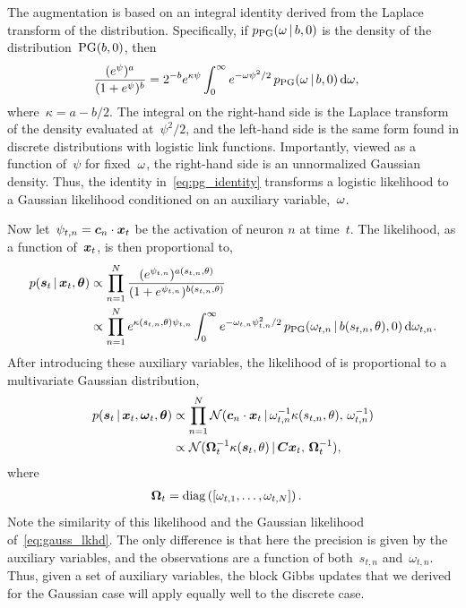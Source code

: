The augmentation is based on an integral identity
derived from the Laplace transform of the \polyagamma distribution.
Specifically, if $p_{\mathrm{PG}}({\omega}\,|\, b, 0)$ is the
density of the \polyagamma distribution~${\mathrm{PG}(b, 0)}$,
then
\begin{align}
  \frac{(e^{\psi})^a}{(1+e^{\psi})^b}
  &= 2^{-b} e^{\kappa \psi}
  \int_{0}^{\infty} e^{-{\omega} \psi^2 /2} \,
  p_{\mathrm{PG}}({\omega} \,|\, b, 0) \, \mathrm{d}{\omega},
\label{eq:pg_identity}
\end{align}
where~${\kappa=a-b/2}$. The integral on the right-hand side is the
Laplace transform of the \polyagamma density evaluated at~$\psi^2/2$,
and the left-hand side is the same form found in discrete
distributions with logistic link functions.  Importantly, viewed as a
function of~$\psi$ for fixed~${\omega}$, the right-hand side is an
unnormalized Gaussian density.  Thus, the identity
in~\eqref{eq:pg_identity} transforms a logistic likelihood to a
Gaussian likelihood conditioned on an auxiliary variable,~${\omega}$.

Now let~$\psi_{t,n} = \boldsymbol{c}_n \cdot \boldsymbol{x}_t$ be the activation of neuron
$n$ at time~$t$. The likelihood, as a function of~$\boldsymbol{x}_t$, is then
proportional to,
\begin{align*}
  p(\boldsymbol{s}_t \,|\, \boldsymbol{x}_t, \boldsymbol{\theta})
  &\propto \prod_{n=1}^N 
  \frac{(e^{\psi_{t,n}})^{a(s_{t,n}, \theta)}}
       {(1+e^{\psi_{t,n}})^{b(s_{t,n}, \theta)}} \\
  &\propto \prod_{n=1}^N 
     e^{\kappa(s_{t,n}, \theta) \psi_{t,n}}
  \int_{0}^{\infty} e^{-{\omega}_{t,n} \psi_{t,n}^2 /2} \,
  p_{\mathrm{PG}}({\omega}_{t,n} \,|\, b(s_{t,n}, \theta), 0) \,
  \mathrm{d}{\omega}_{t,n}.
\end{align*}
After introducing these auxiliary variables, the likelihood
of is proportional to a multivariate Gaussian distribution,
\begin{align*}
  p(\boldsymbol{s}_t \,|\, \boldsymbol{x}_t, \boldsymbol{\omega}_t, \boldsymbol{\theta})
  &\propto \prod_{n=1}^N
  \mathcal{N}(\boldsymbol{c}_n \cdot \boldsymbol{x}_t \,|\,
  \omega_{t,n}^{-1} \kappa(s_{t,n}, \theta), \,
  \omega_{t,n}^{-1}) \\
  &\propto \mathcal{N}(
  \boldsymbol{\Omega}_t^{-1} \kappa(\boldsymbol{s}_t, \theta) \,|\,
  \boldsymbol{C} \boldsymbol{x}_t, \, 
  \boldsymbol{\Omega}_t^{-1}),
\end{align*}
where
\begin{align*}
  \boldsymbol{\Omega}_t &= \mathrm{diag} \left( \left[ \omega_{t,1}, \ldots, \omega_{t,N} \right] \right).
\end{align*}
Note the similarity of this likelihood and the Gaussian likelihood
of~\eqref{eq:gauss_lkhd}. The only difference is that here the
precision is given by the auxiliary variables, and the observations
are a function of both~$s_{t,n}$ and~$\omega_{t,n}$.
Thus, given a set of \polyagamma auxiliary variables, the block Gibbs
updates that we derived for the Gaussian case will apply equally well
to the discrete case.




